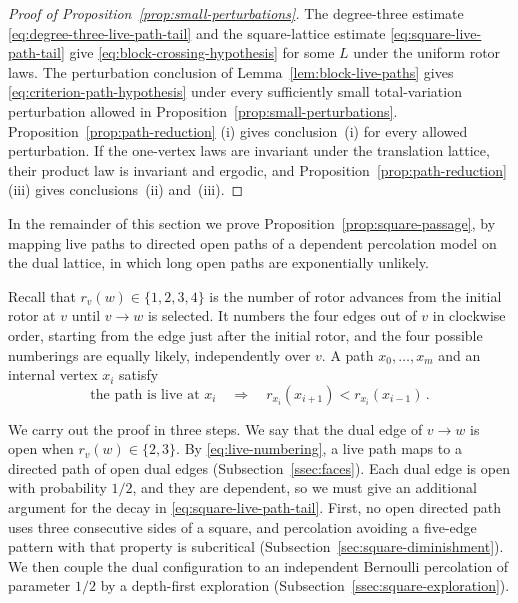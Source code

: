 \documentclass[11pt]{amsart}
\theoremstyle{plain}
\theoremstyle{definition}
\begin{document}
	\begin{proof}[Proof of Proposition~\ref{prop:small-perturbations}]
		The degree-three estimate \eqref{eq:degree-three-live-path-tail} and the
		square-lattice estimate \eqref{eq:square-live-path-tail} give
		\eqref{eq:block-crossing-hypothesis} for some $L$ under the uniform rotor
		laws.  The perturbation conclusion of Lemma~\ref{lem:block-live-paths} gives
		\eqref{eq:criterion-path-hypothesis} under every sufficiently small
		total-variation perturbation allowed in
		Proposition~\ref{prop:small-perturbations}.  Proposition~\ref{prop:path-reduction}
		\textup{(i)} gives conclusion~\textup{(i)} for every allowed perturbation.  If
		the one-vertex laws are invariant under the translation lattice, their product
		law is invariant and ergodic, and Proposition~\ref{prop:path-reduction}\textup{(iii)}
		gives conclusions~\textup{(ii)} and~\textup{(iii)}.
	\end{proof}
	
	In the remainder of this section we prove
	Proposition~\ref{prop:square-passage}, by mapping live paths to directed open
	paths of a dependent percolation model on the dual lattice, in which long open
	paths are exponentially unlikely.

	Recall that $r_v(w)\in\{1,2,3,4\}$ is the number of rotor advances from the
	initial rotor at $v$ until $v\to w$ is selected.  It numbers the four edges out
	of $v$ in clockwise order, starting from the edge just after the initial rotor,
	and the four possible numberings are equally likely, independently over $v$.  A
	path $x_0,\ldots,x_m$ and an internal vertex $x_i$ satisfy
	\begin{equation}\label{eq:live-numbering}
		\text{the path is live at $x_i$}
		\quad\Longrightarrow\quad
		r_{x_i}(x_{i+1})<r_{x_i}(x_{i-1})\, .
	\end{equation}

	We carry out the proof in three steps.  We say that the dual edge of $v\to w$
	is open when $r_v(w)\in\{2,3\}$.  By \eqref{eq:live-numbering}, a live path
	maps to a directed path of open dual edges (Subsection~\ref{ssec:faces}).  Each
	dual edge is open with probability $1/2$, and they are dependent, so we must
	give an additional argument for the decay in
	\eqref{eq:square-live-path-tail}.  First, no open directed path uses three
	consecutive sides of a square, and percolation avoiding a five-edge pattern
	with that property is subcritical (Subsection~\ref{sec:square-diminishment}).  We then couple the
	dual configuration to an independent Bernoulli percolation of parameter $1/2$
	by a depth-first exploration (Subsection~\ref{ssec:square-exploration}).
\end{document}
